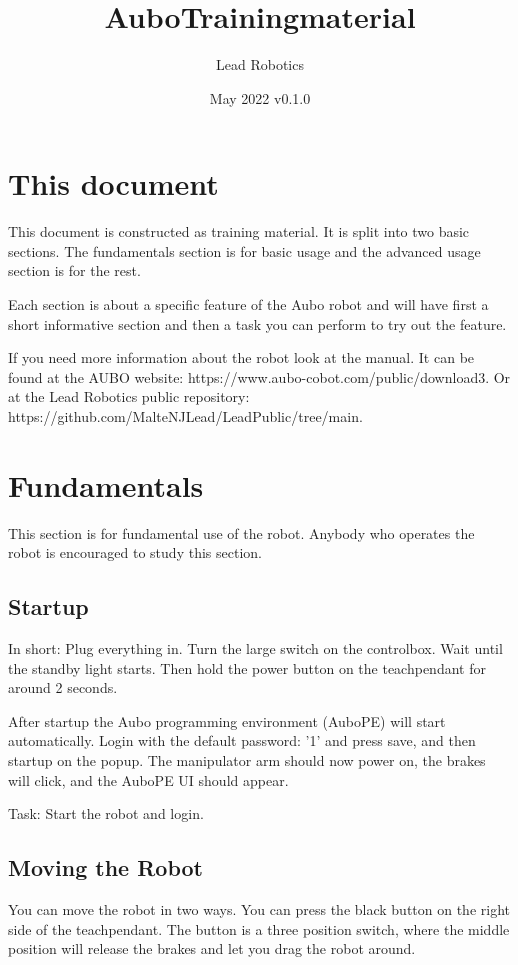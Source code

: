 \documentclass{article}
\title{AuboTrainingmaterial}
\author{Lead Robotics}
\date{May 2022 v0.1.0}
\begin{document}
\maketitle

\tableofcontents

\section{This document} 
This document is constructed as training material. It is split into two basic sections. The fundamentals section is for basic usage and the advanced usage section is for the rest.

Each section is about a specific feature of the Aubo robot and will have first a short informative section and then a task you can perform to try out the feature.

If you need more information about the robot look at the manual. It can be found at the AUBO website: https://www.aubo-cobot.com/public/download3. Or at the Lead Robotics public repository: https://github.com/MalteNJLead/LeadPublic/tree/main.

\section{Fundamentals}
This  section is for fundamental use of the robot. Anybody who operates the robot is encouraged to study this section. 

\subsection{Startup}

In short: Plug everything in. Turn the large switch on the controlbox. Wait until the standby light starts. Then hold the power button on the teachpendant for around 2 seconds.  

After startup the Aubo programming environment (AuboPE) will start automatically. Login with the default password: '1' and press save, and then startup on the popup. The manipulator arm should now power on, the brakes will click, and the AuboPE UI should appear.  

Task: 
Start the robot and login. 

\subsection{Moving the Robot}
You can move the robot in two ways. 
You can press the black button on the right side of the teachpendant. The button is a three position switch, where the middle position will release the brakes and let you drag the robot around.
\end{document}
